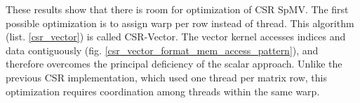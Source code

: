 \documentclass{article}
\begin{document}
These results show that there is room for optimization of CSR SpMV. The first possible optimization is to assign warp per row instead of thread.
This algorithm (list. \ref{csr_vector}) is called CSR-Vector. The vector kernel accesses indices and data contiguously (fig. \ref{csr_vector_format_mem_access_pattern}), 
and therefore overcomes the principal deficiency of the scalar approach. Unlike the previous CSR implementation, which used one thread per matrix row, this optimization requires
coordination among threads within the same warp. 

\begin{figure}[H]
\centering
{}
\qquad %
\end{figure}
\end{document}
